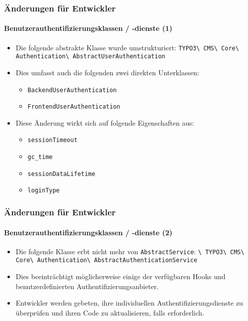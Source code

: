 \begin{frame}[fragile]
	\frametitle{Änderungen für Entwickler}
	\framesubtitle{Benutzerauthentifizierungsklassen / -dienste (1)}

	\begin{itemize}
		\item Die folgende abstrakte Klasse wurde umstrukturiert:\newline
			\small\texttt{TYPO3\textbackslash
				CMS\textbackslash
				Core\textbackslash
				Authentication\textbackslash
				AbstractUserAuthentication}\normalsize
		\item Dies umfasst auch die folgenden zwei direkten Unterklassen:

			\begin{itemize}
				\item \texttt{BackendUserAuthentication}
				\item \texttt{FrontendUserAuthentication}
			\end{itemize}

		\item Diese Änderung wirkt sich auf folgende Eigenschaften aus:

			\begin{itemize}
				\item \texttt{sessionTimeout}
				\item \texttt{gc\_time}
				\item \texttt{sessionDataLifetime}
				\item \texttt{loginType}
			\end{itemize}

	\end{itemize}

\end{frame}


\begin{frame}[fragile]
	\frametitle{Änderungen für Entwickler}
	\framesubtitle{Benutzerauthentifizierungsklassen / -dienste (2)}

	\begin{itemize}

		\item Die folgende Klasse erbt nicht mehr von 
			\smaller\texttt{AbstractService}\normalsize\hspace{0.1cm}:
			\smaller\texttt{\textbackslash
				TYPO3\textbackslash
				CMS\textbackslash
				Core\textbackslash
				Authentication\textbackslash
				AbstractAuthenticationService}\normalsize

		\item Dies beeinträchtigt möglicherweise einige der verfügbaren Hooks und benutzerdefinierten Authentifizierungsanbieter.

		\item Entwickler werden gebeten, ihre individuellen Authentifizierungsdienste zu überprüfen 
			und ihren Code zu aktualisieren, falls erforderlich.

	\end{itemize}

\end{frame}

